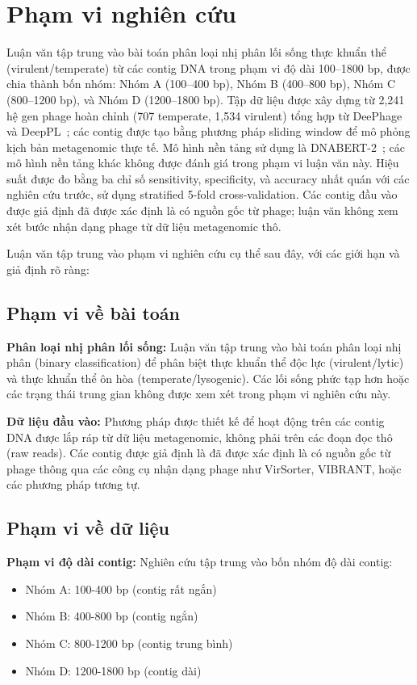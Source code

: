 \section{Phạm vi nghiên cứu}
\label{sec:scope}

Luận văn tập trung vào bài toán phân loại nhị phân lối sống thực khuẩn thể (virulent/temperate) từ các contig DNA trong phạm vi độ dài 100--1800 bp, được chia thành bốn nhóm: Nhóm A (100--400 bp), Nhóm B (400--800 bp), Nhóm C (800--1200 bp), và Nhóm D (1200--1800 bp). Tập dữ liệu được xây dựng từ 2,241 hệ gen phage hoàn chỉnh (707 temperate, 1,534 virulent) tổng hợp từ DeePhage~\cite{wu2021deephage} và DeepPL~\cite{zhang2024deeppl}; các contig được tạo bằng phương pháp sliding window để mô phỏng kịch bản metagenomic thực tế. Mô hình nền tảng sử dụng là DNABERT-2~\cite{zhou2023dnabert}; các mô hình nền tảng khác không được đánh giá trong phạm vi luận văn này. Hiệu suất được đo bằng ba chỉ số sensitivity, specificity, và accuracy nhất quán với các nghiên cứu trước, sử dụng stratified 5-fold cross-validation. Các contig đầu vào được giả định đã được xác định là có nguồn gốc từ phage; luận văn không xem xét bước nhận dạng phage từ dữ liệu metagenomic thô.

Luận văn tập trung vào phạm vi nghiên cứu cụ thể sau đây, với các giới hạn và giả định rõ ràng:

\subsection{Phạm vi về bài toán}

\textbf{Phân loại nhị phân lối sống:} Luận văn tập trung vào bài toán phân loại nhị phân (binary classification) để phân biệt thực khuẩn thể độc lực (virulent/lytic) và thực khuẩn thể ôn hòa (temperate/lysogenic). Các lối sống phức tạp hơn hoặc các trạng thái trung gian không được xem xét trong phạm vi nghiên cứu này.

\textbf{Dữ liệu đầu vào:} Phương pháp được thiết kế để hoạt động trên các contig DNA được lắp ráp từ dữ liệu metagenomic, không phải trên các đoạn đọc thô (raw reads). Các contig được giả định là đã được xác định là có nguồn gốc từ phage thông qua các công cụ nhận dạng phage như VirSorter, VIBRANT, hoặc các phương pháp tương tự.

\subsection{Phạm vi về dữ liệu}

\textbf{Phạm vi độ dài contig:} Nghiên cứu tập trung vào bốn nhóm độ dài contig:
\begin{itemize}
    \item Nhóm A: 100-400 bp (contig rất ngắn)
    \item Nhóm B: 400-800 bp (contig ngắn)
    \item Nhóm C: 800-1200 bp (contig trung bình)
    \item Nhóm D: 1200-1800 bp (contig dài)
\end{itemize}

